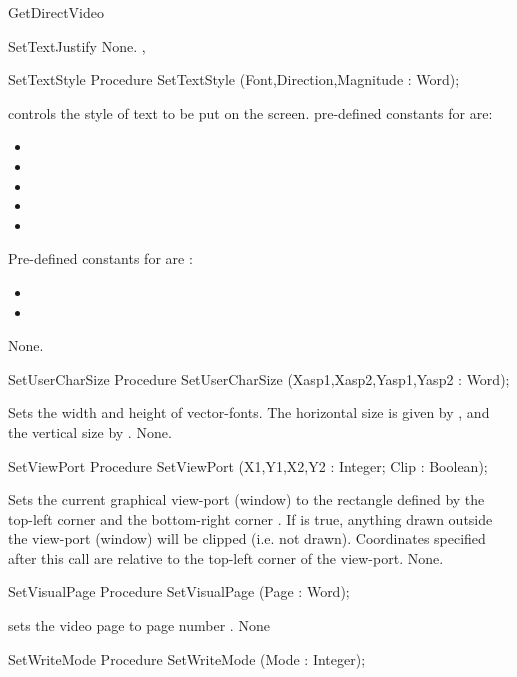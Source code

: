 \begin{function}{GetDirectVideo}
\begin{procedure}{SetTextJustify}
\Errors
None.
\SeeAlso
{}, 
\end{procedure}
\begin{procedure}{SetTextStyle}
\Declaration
Procedure SetTextStyle (Font,Direction,Magnitude : Word);

\Description
{} controls the style of text to be put on the screen.
pre-defined constants for  are:
\begin{itemize}
\item {}
\item {}
\item {}
\item {}
\item {}
\end{itemize}
Pre-defined constants for  are :
\begin{itemize}
\item {}
\item {}
\end{itemize}
\Errors
None.
\SeeAlso
{} 
\end{procedure}
\begin{procedure}{SetUserCharSize}
\Declaration
Procedure SetUserCharSize (Xasp1,Xasp2,Yasp1,Yasp2 : Word);

\Description
Sets the width and height of vector-fonts. The horizontal size is given
by , and the vertical size by .
\Errors
None.
\SeeAlso
{}
\end{procedure}
\begin{procedure}{SetViewPort}
\Declaration
Procedure SetViewPort (X1,Y1,X2,Y2 : Integer; Clip : Boolean);

\Description
Sets the current graphical view-port (window) to the rectangle defined by
the top-left corner  and the bottom-right corner .
If  is true, anything drawn outside the view-port (window) will be
clipped (i.e. not drawn). Coordinates specified after this call are relative
to the top-left corner of the view-port.
\Errors
None.
\SeeAlso
{}
\end{procedure}
\begin{procedure}{SetVisualPage}
\Declaration
Procedure SetVisualPage (Page : Word);

\Description
{} sets the video page to page number . 
\Errors
None
\SeeAlso
{}
\end{procedure}
\begin{procedure}{SetWriteMode}
\Declaration
Procedure SetWriteMode (Mode : Integer);


\end{procedure}
\end{function}

